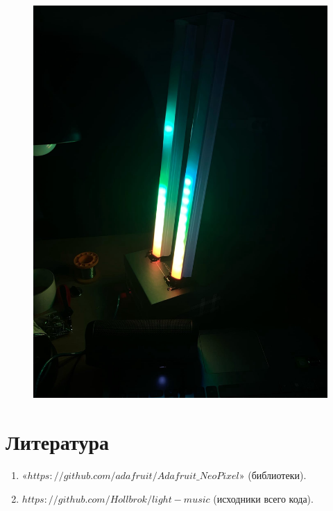 \documentclass[a4paper, 12pt]{article}%
\begin{document}
\begin{figure}[!h]
\begin{center}
\includegraphics[scale=0.25]{pictures/bea2.jpg}
\end{center}
\end{figure}

\newpage

\section{Литература}


\begin{enumerate}

\item $«https://github.com/adafruit/Adafruit\_NeoPixel»$  (библиотеки).

\item $https://github.com/Hollbrok/light-music$ (исходники всего кода).

\end{enumerate}	
\end{document}

